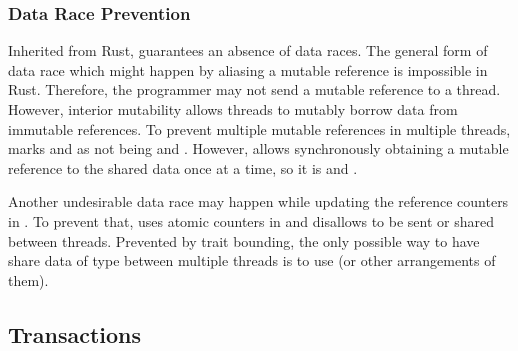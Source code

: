 


\subsubsection{Data Race Prevention}
\label{sec:no-race}

Inherited from Rust, \this{} guarantees an absence of data races. The general form of data race which might happen by aliasing a mutable reference is impossible in Rust. Therefore, the programmer may not send a mutable reference to a thread. However, interior mutability allows threads to mutably borrow data from immutable references. To prevent multiple mutable references in multiple threads, \this{} marks  and  as not being  and . However,  allows synchronously obtaining a mutable reference to the shared data once at a time, so it is  and .

Another undesirable data race may happen while updating the reference counters in . To prevent that, \this{} uses atomic counters in  and disallows  to be sent or shared between threads. Prevented by trait bounding, the only possible way to have share data of type  between multiple threads is to use  (or other arrangements of them).


\subsection{Transactions}
\label{sec:mutex}

